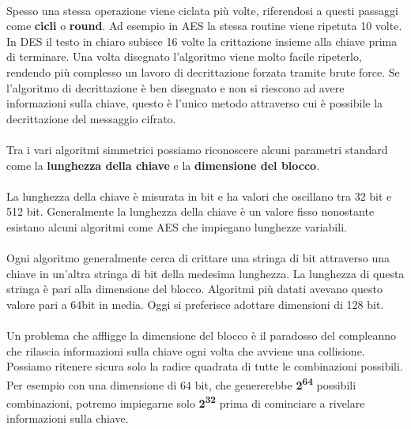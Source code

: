 \documentclass{article}
\begin{document}
		\paragraph{}
		Spesso una stessa operazione viene ciclata più volte, riferendosi a questi passaggi come \textbf{cicli} o \textbf{round}. Ad esempio in AES la stessa routine viene ripetuta 10 volte. In DES il testo in chiaro subisce 16 volte la crittazione insieme alla chiave prima di terminare. Una volta disegnato l'algoritmo viene molto facile ripeterlo, rendendo più complesso un lavoro di decrittazione forzata tramite brute force. Se l'algoritmo di decrittazione è ben disegnato e non si riescono ad avere informazioni sulla chiave, questo è l'unico metodo attraverso cui è possibile la decrittazione del messaggio cifrato.
		\paragraph{}
		Tra i vari algoritmi simmetrici possiamo riconoscere alcuni parametri standard come la \textbf{lunghezza della chiave} e la \textbf{dimensione del blocco}.
		\paragraph{}
		La lunghezza della chiave è misurata in bit e ha valori che oscillano tra 32 bit e 512 bit. Generalmente la lunghezza della chiave è un valore fisso nonostante esistano alcuni algoritmi come AES che impiegano lunghezze variabili.
		\paragraph{}
		Ogni algoritmo generalmente cerca di crittare una stringa di bit attraverso una chiave in un'altra stringa di bit della medesima lunghezza. La lunghezza di questa stringa è pari alla dimensione del blocco. Algoritmi più datati avevano questo valore pari a 64bit in media. Oggi si preferisce adottare dimensioni di 128 bit.
		\paragraph{}
		Un problema che affligge la dimensione del blocco è il paradosso del compleanno che rilascia informazioni sulla chiave ogni volta che avviene una collisione. Possiamo ritenere sicura solo la radice quadrata di tutte le combinazioni possibili. Per esempio con una dimensione di 64 bit, che genererebbe \textbf{2\textsuperscript{64}} possibili combinazioni, potremo impiegarne solo \textbf{2\textsuperscript{32}} prima di cominciare a rivelare informazioni sulla chiave.
\end{document}
